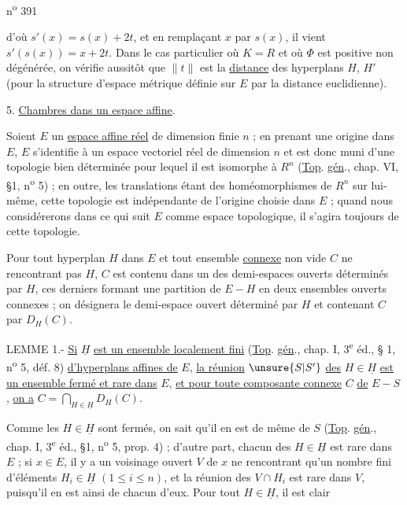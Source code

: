 
n\textsuperscript{o} 391

d'où $s'(x)=s(x)+2t$, et en remplaçant $x$ par $s(x)$, il vient $s'(s(x))=x+2t$.
Dans le cas particulier où $K=R$ et où $\Phi$ est positive non dégénérée, on vérifie aussitôt que $\lVert t\rVert$ est la \uline{distance} des hyperplans $H$, $H'$ (pour la structure d'espace métrique définie sur $E$ par la distance euclidienne).

5. \uline{Chambres dans un espace affine}.

Soient $E$ un \uline{espace affine réel} de dimension finie $n$ ; en prenant une origine dans $E$, $E$ s'identifie à un espace vectoriel réel de dimension $n$ et est donc muni d'une topologie bien déterminée pour lequel il est isomorphe à $R^n$ (\uline{Top}. \uline{gén}., chap. VI, §1, n\textsuperscript{o} 5) ; en outre, les translations étant des homéomorphismes de $R^n$ sur lui-même, cette topologie est indépendante de l'origine choisie dans $E$ ; quand nous considérerons dans ce qui suit $E$ comme espace topologique, il s'agira toujours de cette topologie.

Pour tout hyperplan $H$ dans $E$ et tout ensemble \uline{connexe} non vide $C$ ne rencontrant pas $H$, $C$ est contenu dans un des demi-espaces ouverts déterminés par $H$, ces derniers formant une partition de $E-H$ en deux ensembles ouverts connexes ; on désignera le demi-espace ouvert déterminé par $H$ et contenant $C$ par $D_H(C)$.

LEMME 1.- \uline{Si} $\underline H$ \uline{est un ensemble localement fini} (\uline{Top}. \uline{gén}., chap. I, 3\textsuperscript{e} éd., § 1, n\textsuperscript{o} 5, déf. 8) \uline{d'hyperplans affines de} $E$, \uline{la réunion} $\unsure{S|S'}$ \uline{des} $H\in\underline H$ \uline{est un ensemble fermé et rare dans} $E$, \uline{et pour toute composante connexe} $C$ \uline{de} $E-S$, \uline{on a} $C=\bigcap\limits_{H\in\underline H}D_H(C)$.

Comme les $H\in\underline H$ sont fermés, on sait qu'il en est de même de $S$ (\uline{Top}. \uline{gén}., chap. I, 3\textsuperscript{e} éd., §1, n\textsuperscript{o} 5, prop. 4) ; d'autre part, chacun des $H\in\underline H$ est rare dans $E$ ; si $x\in E$, il y a un voisinage ouvert $V$ de $x$ ne rencontrant qu'un nombre fini d'éléments $H_i\in\underline H$ $(1\leq i\leq n)$, et la réunion des $V\cap H_i$ est rare dans $V$, puisqu'il en est ainsi de chacun d'eux. Pour tout $H\in\underline H$, il est clair

